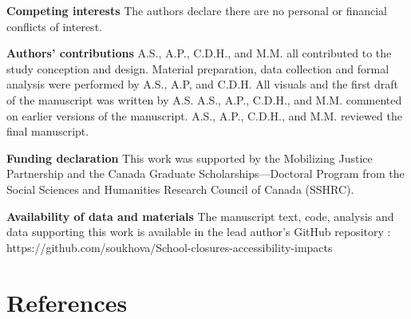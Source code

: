 \documentclass[
default
]{sn-jnl}
\begin{document}
\textbf{Competing interests} The authors declare there are no personal
or financial conflicts of interest.

\textbf{Authors' contributions} A.S., A.P., C.D.H., and M.M. all
contributed to the study conception and design. Material preparation,
data collection and formal analysis were performed by A.S., A.P, and
C.D.H. All visuals and the first draft of the manuscript was written by
A.S. A.S., A.P., C.D.H., and M.M. commented on earlier versions of the
manuscript. A.S., A.P., C.D.H., and M.M. reviewed the final manuscript.

\textbf{Funding declaration} This work was supported by the Mobilizing
Justice Partnership and the Canada Graduate Scholarships---Doctoral
Program from the Social Sciences and Humanities Research Council of
Canada (SSHRC).

\textbf{Availability of data and materials} The manuscript text, code,
analysis and data supporting this work is available in the lead author's
GitHub repository :
https://github.com/soukhova/School-closures-accessibility-impacts

\pagebreak

\section{References}\label{references}
\end{document}

